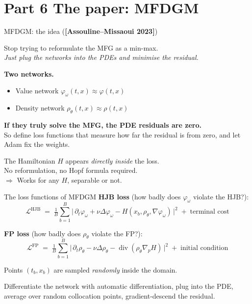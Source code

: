 \documentclass[10pt,aspectratio=169]{beamer}
\newcommand{\Div}{\operatorname{div}}
\newcommand{\teal}[1]{\textcolor{kaustteal}{#1}}
\newcommand{\blue}[1]{\textcolor{kaustblue}{#1}}
\newcommand{\citehl}[1]{\textcolor{kaustblue!80!black}{\textbf{[#1]}}}
\begin{document}
\section{Part 6 \;\textbar\; The paper: MFDGM}

\begin{frame}{MFDGM: the idea \;\textnormal{(\citehl{Assouline--Missaoui 2023})}}
\begin{idea}[title=Key insight]
Stop trying to reformulate the MFG as a min-max.\\
\emph{Just plug the networks into the PDEs and minimise the residual.}
\end{idea}

\medskip
\textbf{Two networks.}
\smallskip
\begin{itemize}\setlength\itemsep{1pt}
  \item \blue{Value network} $\varphi_\omega(t,x) \approx \varphi(t,x)$
  \item \teal{Density network} $\rho_\theta(t,x) \approx \rho(t,x)$
\end{itemize}

\medskip
\textbf{If they truly solve the MFG, the PDE residuals are zero.}\\
So define loss functions that measure how far the residual is from zero,
and let Adam fix the weights.

\medskip
The Hamiltonian $H$ appears \emph{directly inside} the loss.\\
\alert{No reformulation, no Hopf formula required.}\\
$\Rightarrow$ \teal{Works for any $H$, separable or not.}
\end{frame}

\begin{frame}{The loss functions of MFDGM}
\textbf{HJB loss} (how badly does $\varphi_\omega$ violate the HJB?):
\[
  \mathcal{L}^{\text{HJB}} \;=\;
  \tfrac1B \sum_{b=1}^B
  \bigl|\,\partial_t\varphi_\omega + \nu\Delta\varphi_\omega
  - H(x_b,\rho_\theta,\nabla\varphi_\omega)\,\bigr|^2
  \;+\;\text{terminal cost}
\]

\textbf{FP loss} (how badly does $\rho_\theta$ violate the FP?):
\[
  \mathcal{L}^{\text{FP}} \;=\;
  \tfrac1B \sum_{b=1}^B
  \bigl|\,\partial_t\rho_\theta - \nu\Delta\rho_\theta
  - \Div(\rho_\theta\nabla_p H)\,\bigr|^2
  \;+\;\text{initial condition}
\]

\smallskip
Points $(t_b,x_b)$ are sampled \emph{randomly} inside the domain.

\medskip
\begin{recap}[title=This is the PINN paradigm (\citehl{Raissi et al.\ 2019})]
Differentiate the network with automatic differentiation, plug into the
PDE, average over random collocation points, gradient-descend the
residual.
\end{recap}
\end{frame}
\end{document}
